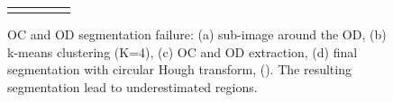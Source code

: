 \begin{figure}[h]
\begin{tabular}{c c c c c}
    {} & {} & {} & {} & {} \\
    
    \end{tabular}

\caption{\label{segmentation_results_failures}OC and OD segmentation failure: (a) sub-image around the OD, (b) k-means clustering (K=4), (c) OC and OD extraction, (d) final segmentation with circular Hough transform, (). The resulting segmentation lead to underestimated regions.}

\end{figure}